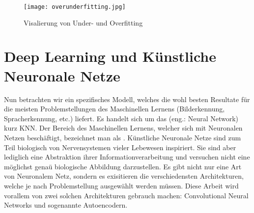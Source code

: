 \begin{figure}[h!]
  \centering
  \texttt{[image: overunderfitting.jpg]}
  \caption{Visalierung von Under- und Overfitting}
\end{figure}

\cite{wiki:overfitting}


\chapter{Deep Learning und Künstliche Neuronale Netze}
Nun betrachten wir ein spezifisches Modell, welches die wohl besten Resultate
für die meisten Problemstellungen des Maschinellen Lernens (Bilderkennung,
Spracherkennung, etc.) liefert. Es handelt sich um das  (eng.: Neural Network) kurz KNN.
Der Bereich des Maschinellen Lernens, welcher sich mit Neuronalen Netzen
beschäftigt, bezeichnet man als .
\para{}
Künstliche Neuronale Netze sind zum Teil biologisch von Nervensystemen vieler
Lebewesen inspiriert.
Sie sind aber lediglich eine Abstraktion ihrer Informationverarbeitung und versuchen nicht eine möglichst genaü biologische Abbildung darzustellen.
Es gibt nicht nur eine Art von Neuronalem Netz, sondern es exisitieren die
verschiedensten Architekturen, welche je nach Problemstellung ausgewählt werden
müssen. Diese Arbeit wird vorallem von zwei solchen Architekturen gebrauch machen:
Convolutional Neural Networks und sogenannte Autoencodern.

\para{}
\cite{wiki:kuenstliches_neuronales_netz}

